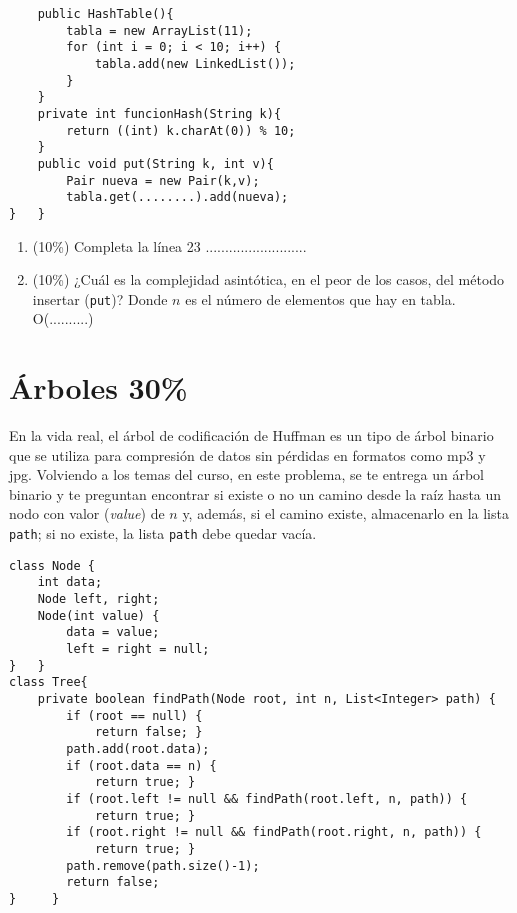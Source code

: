 \documentclass[10 pt]{article}
\begin{document}
\begin{multicols}{2}
{\begin{lstlisting}
    public HashTable(){
        tabla = new ArrayList(11);
        for (int i = 0; i < 10; i++) {
            tabla.add(new LinkedList());
        }
    }
    private int funcionHash(String k){
        return ((int) k.charAt(0)) % 10;
    }
    public void put(String k, int v){
        Pair nueva = new Pair(k,v);
        tabla.get(........).add(nueva);
}   }
\end{lstlisting}
}
\begin{enumerate}[label=\Alph*]
	\item (10\%) Completa la línea 23 ..........................
	\item (10\%) ¿Cuál es la complejidad asintótica, en el peor de los casos, del método insertar (\texttt{put})? Donde $n$ es el número de elementos que hay en tabla. \\
	O(..........)
\end{enumerate}


\section{Árboles 30\%}
En la vida real, el árbol de codificación de Huffman es un tipo de árbol binario que se utiliza para compresión de datos sin pérdidas en formatos como mp3 y jpg. Volviendo a los temas del curso, en este problema, se te entrega un árbol binario y te preguntan encontrar si existe o no un camino desde la raíz hasta un nodo con valor (\emph{value}) de $n$ y, además, si el camino existe, almacenarlo en la lista \texttt{path}; si no existe, la lista \texttt{path} debe quedar vacía. 
{\small
\begin{lstlisting}
class Node { 
    int data; 
    Node left, right; 
    Node(int value) { 
        data = value; 
        left = right = null; 
}   } 
class Tree{    
    private boolean findPath(Node root, int n, List<Integer> path) { 
        if (root == null) { 
            return false; }  
        path.add(root.data); 
        if (root.data == n) { 
            return true; } 
        if (root.left != null && findPath(root.left, n, path)) { 
            return true; } 
        if (root.right != null && findPath(root.right, n, path)) { 
            return true; } 
        path.remove(path.size()-1); 
        return false; 
}     }
\end{lstlisting}
}



\end{multicols}
\end{document}
